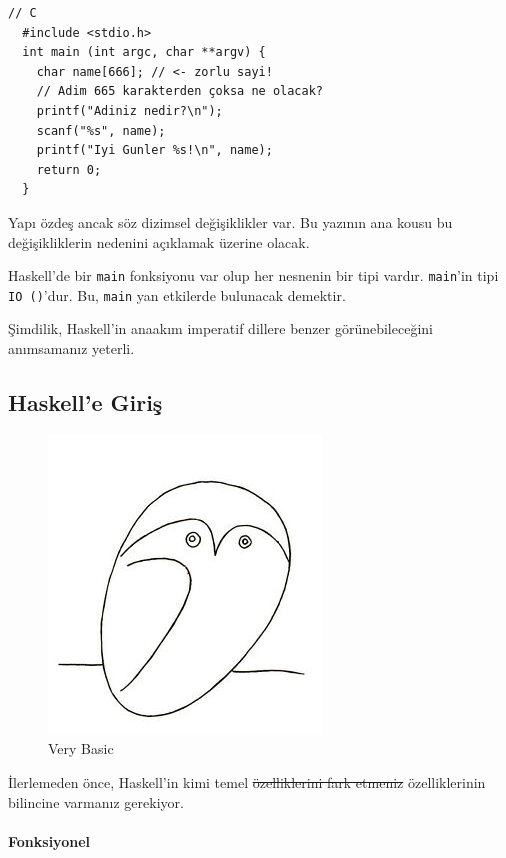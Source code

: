\documentclass[a4paper,14pt,openany]{extbook} %
\let\oldparagraph\paragraph
\renewcommand{\paragraph}[1]{\oldparagraph{#1}\mbox{}}
\begin{document}
\begin{lstlisting}[language= {[ANSI]C},tabsize=2,escapeinside=||]
  // C
  #include <stdio.h>
  int main (int argc, char **argv) {
    char name[666]; // <- zorlu sayi!
    // Adim 665 karakterden çoksa ne olacak?
    printf("Adiniz nedir?\n");
    scanf("%s", name);
    printf("Iyi Gunler %s!\n", name);
    return 0;
  }
\end{lstlisting}

Yapı özdeş ancak söz dizimsel değişiklikler var. Bu yazının ana kousu bu
değişikliklerin nedenini açıklamak üzerine olacak.

Haskell'de bir \lstinline!main! fonksiyonu var olup her nesnenin bir
tipi vardır. \lstinline!main!'in tipi \lstinline!IO ()!'dur. Bu,
\lstinline!main! yan etkilerde bulunacak demektir.

Şimdilik, Haskell'in anaakım imperatif dillere benzer görünebileceğini
anımsamanız yeterli.

\subsection{Haskell'e Giriş}\label{haskelle-giriux15f} %

\begin{figure}[htbp]
  \centering
  \includegraphics{img/picasso_owl.jpg}
  \caption{Very Basic}
\end{figure}

İlerlemeden önce, Haskell'in kimi temel \st{özelliklerini fark etmeniz}
özelliklerinin bilincine varmanız gerekiyor.

\paragraph{Fonksiyonel}\label{fonksiyonel}
\end{document}
